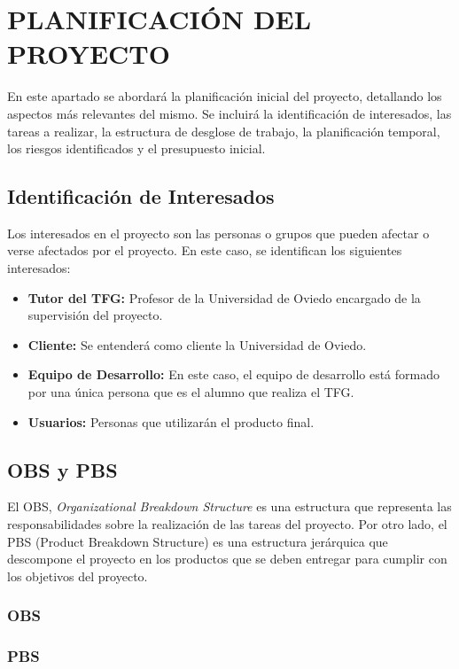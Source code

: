 \section{PLANIFICACIÓN DEL PROYECTO}
En este apartado se abordará la planificación inicial del proyecto, detallando los aspectos más relevantes del mismo. 
Se incluirá la identificación de interesados, las tareas a realizar, la estructura de desglose de trabajo, la planificación temporal, los riesgos identificados y el presupuesto inicial.

\subsection{Identificación de Interesados}
Los interesados en el proyecto son las personas o grupos que pueden afectar o verse afectados por el proyecto. En este caso, se identifican los siguientes interesados:
\begin{itemize}
    \item \textbf{Tutor del TFG:} Profesor de la Universidad de Oviedo encargado de la supervisión del proyecto.
    \item \textbf{Cliente:} Se entenderá como cliente la Universidad de Oviedo.
    \item \textbf{Equipo de Desarrollo:} En este caso, el equipo de desarrollo está formado por una única persona que es el alumno que realiza el TFG.
    \item \textbf{Usuarios:} Personas que utilizarán el producto final.
\end{itemize}

\subsection{OBS y PBS}
El OBS, \textit{Organizational Breakdown Structure} es una estructura que representa las responsabilidades sobre la realización de las tareas del proyecto. 
Por otro lado, el PBS (Product Breakdown Structure) es una estructura jerárquica que descompone el proyecto en los productos que se deben entregar para cumplir con los objetivos del proyecto.

\subsubsection{OBS}
\hypertarget{sec:5-OBS}{}


\subsubsection{PBS}
\hypertarget{sec:5-PBS}{}


